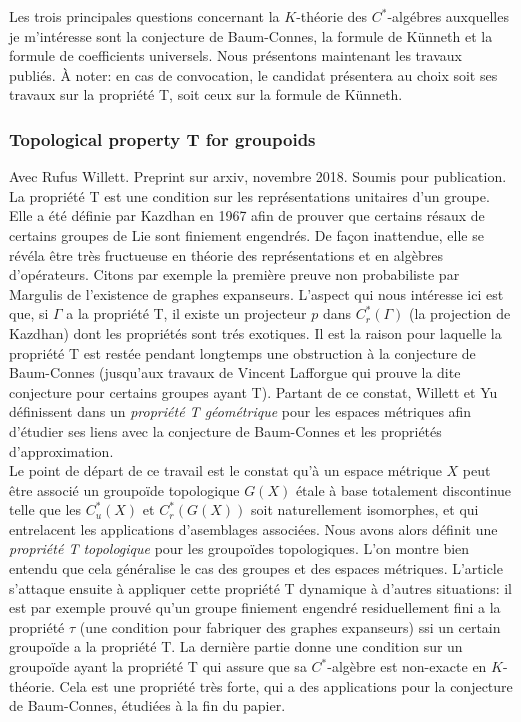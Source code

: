 \documentclass[a4paper,11pt]{article}
\begin{document}
Les trois principales questions concernant la $K$-th\'eorie des $C^*$-alg\'ebres auxquelles je m'int\'eresse sont la conjecture de Baum-Connes, la formule de K\"unneth et la formule de coefficients universels. Nous pr\'esentons maintenant les travaux publi\'es. \`A noter: en cas de convocation, le candidat pr\'esentera au choix soit ses travaux sur la propri\'et\'e T, soit ceux sur la formule de K\"unneth.

\subsubsection*{Topological property T for groupoids} 
Avec Rufus Willett. Preprint sur arxiv, novembre 2018. Soumis pour publication.\\

La propri\'et\'e T est une condition sur les repr\'esentations unitaires d'un groupe. Elle a \'et\'e d\'efinie par Kazdhan \cite{kazhdan1967connection} en 1967 afin de prouver que certains r\'esaux de certains groupes de Lie sont finiement engendr\'es. De fa\c{c}on inattendue, elle se r\'ev\'ela \^etre tr\`es fructueuse en th\'eorie des repr\'esentations et en alg\`ebres d'op\'erateurs. Citons par exemple la premi\`ere preuve non probabiliste par Margulis de l'existence de graphes expanseurs. L'aspect qui nous int\'eresse ici est que, si $\Gamma$ a la propri\'et\'e T, il existe un projecteur $p$ dans $C^*_r(\Gamma)$ (la projection de Kazdhan) dont les propri\'et\'es sont tr\'es exotiques. Il est la raison pour laquelle la propri\'et\'e T est rest\'ee pendant longtemps une obstruction \`a la conjecture de Baum-Connes (jusqu'aux travaux de Vincent Lafforgue \cite{lafforgue2002k} qui prouve la dite conjecture pour certains groupes ayant T). Partant de ce constat, Willett et Yu d\'efinissent dans \cite{WillettYu} un \textit{propri\'et\'e T g\'eom\'etrique} pour les espaces m\'etriques afin d'\'etudier ses liens avec la conjecture de Baum-Connes et les propri\'et\'es d'approximation.\\

Le point de d\'epart de ce travail est le constat qu'\`a un espace m\'etrique $X$ peut \^etre associ\'e un groupo\"ide topologique $G(X)$ \'etale \`a base totalement discontinue telle que les $C^*_u(X)$ et $C_r^*(G(X))$ soit naturellement isomorphes, et qui entrelacent les applications d'asemblages associ\'ees. Nous avons alors d\'efinit une \textit{propri\'et\'e T topologique} pour les groupo\"ides topologiques. L'on montre bien entendu que cela g\'en\'eralise le cas des groupes et des espaces m\'etriques. L'article s'attaque ensuite \`a appliquer cette propri\'et\'e T dynamique \`a d'autres situations: il est par exemple prouv\'e qu'un groupe finiement engendr\'e residuellement fini a la propri\'et\'e $\tau$ (une condition pour fabriquer des graphes expanseurs) ssi un certain groupo\"ide a la propri\'et\'e T. La derni\`ere partie donne une condition sur un groupo\"ide ayant la propri\'et\'e T qui assure que sa $C^*$-alg\`ebre est non-exacte en $K$-th\'eorie. Cela est une propri\'et\'e tr\`es forte, qui a des applications pour la conjecture de Baum-Connes, \'etudi\'ees \`a la fin du papier. 
\end{document}
